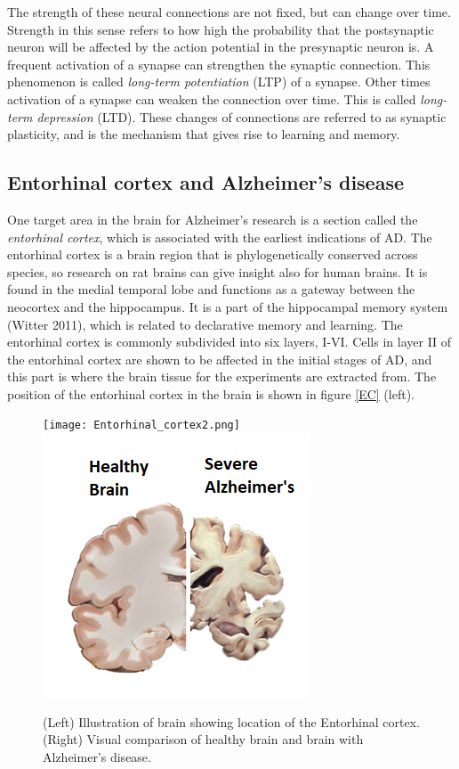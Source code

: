 The strength of these neural connections are not fixed, but can change over time. Strength in this sense refers to how high the probability that the postsynaptic neuron will be affected by the action potential in the presynaptic neuron is. A frequent activation of a synapse can strengthen the synaptic connection. This phenomenon is called \textit{long-term potentiation} (LTP) of a synapse. Other times activation of a synapse can weaken the connection over time. This is called \textit{long-term depression} (LTD). These changes of connections are referred to as synaptic plasticity, and is the mechanism that gives rise to learning and memory. \\

\subsection{Entorhinal cortex and Alzheimer's disease}
\label{EandA}

One target area in the brain for Alzheimer's research is a section called the \textit{entorhinal cortex}, which is associated with the earliest indications of AD. The entorhinal cortex is a brain region that is phylogenetically conserved across species, so research on rat brains can give insight also for human brains. It is found in the medial temporal lobe and functions as a gateway between the neocortex and the hippocampus. It is a part of the hippocampal memory system (Witter 2011), which is related to declarative memory and learning. The entorhinal cortex is commonly subdivided into six layers, I-VI. Cells in layer II of the entorhinal cortex are shown to be affected in the initial stages of AD, and this part is where the brain tissue for the experiments are extracted from. The position  of the entorhinal cortex in the brain is shown in figure \ref{EC} (left).

\begin{figure}[h]
    \caption{(Left) Illustration of brain showing location of the Entorhinal cortex. (Right) Visual comparison of healthy brain and brain with Alzheimer's disease.}
    \label{EC}
    \centering
    \texttt{[image: Entorhinal\_cortex2.png]}
    \includegraphics[scale=0.8]{fig/Alzheimers_picture.png}    
    \label{brain}
\end{figure} 

